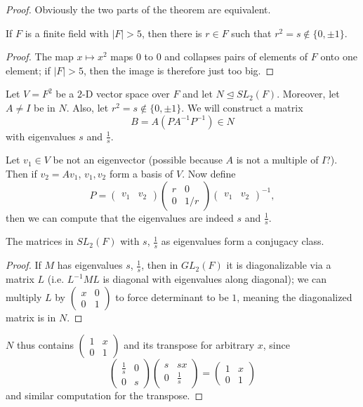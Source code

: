 \documentclass[10pt]{scrartcl}
\providecommand{\inv}{^{-1}}
\begin{document}
\begin{proof}
	Obviously the two parts of the theorem are equivalent.
	
	\begin{claim}
		If $F$ is a finite field with $|F| > 5$, then
		there is $r\in F$ such that $r^2 = s\notin\{0, \pm 1\}$.
	\end{claim}
	\begin{proof}
		The map $x\mapsto x^2$ maps $0$ to $0$ and collapses pairs
		of elements of $F$ onto one element; if $|F| > 5$,
		then the image is therefore just too big.
	\end{proof}

	Let $V = F^2$ be a $2$-D vector space over $F$ and let
	$N\trianglelefteq SL_2(F)$. Moreover, let $A\ne I$ be in $N$.
	Also, let $r^2 = s\notin\{0,\pm1\}$. We will construct a matrix
	\[B = A(PA\inv P\inv)\in N\]
	with eigenvalues $s$ and $\frac1s$.
	
	Let $v_1\in V$ be not an eigenvector (possible because $A$ is not
	a multiple of $I$?). Then if $v_2 = Av_1$, $v_1,v_2$ form a basis of $V$.
	Now define
	\[P = \begin{pmatrix}
		v_1&v_2
	\end{pmatrix}\begin{pmatrix}
		r&0\\
		0&1/r
	\end{pmatrix}\begin{pmatrix}
		v_1&v_2
	\end{pmatrix}\inv,\]
	then we can compute that the eigenvalues are indeed $s$ and $\frac1s$.
	
	\begin{claim}
		The matrices in $SL_2(F)$ with $s$, $\frac1s$ as eigenvalues
		form a conjugacy class.
	\end{claim}
	\begin{proof}
		If $M$ has eigenvalues $s$, $\frac1s$, then in $GL_2(F)$
		it is diagonalizable via a matrix $L$ (i.e. $L\inv ML$
		is diagonal with eigenvalues along diagonal);
		we can multiply $L$ by $\begin{pmatrix}
			x&0\\0&1
		\end{pmatrix}$ to force determinant to be $1$,
		meaning the diagonalized matrix is in $N$.
	\end{proof}
	
	$N$ thus contains
	$\begin{pmatrix}
		1&x\\0&1
	\end{pmatrix}$ and its transpose for arbitrary $x$, since
	\[\begin{pmatrix}
		\frac1s & 0\\0 & s
	\end{pmatrix}
	\begin{pmatrix}
		s & sx\\0 & \frac1s
	\end{pmatrix} =\begin{pmatrix}
		1&x\\0&1
	\end{pmatrix}\]
	and similar computation for the transpose.
	

\end{proof}
\end{document}
